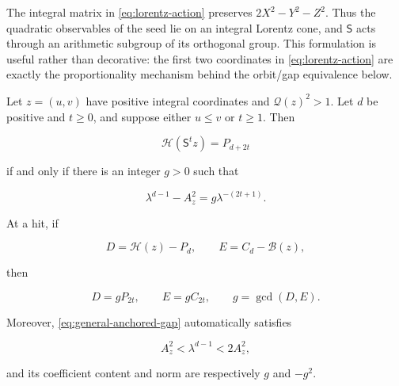 The integral matrix in \cref{eq:lorentz-action} preserves
$2X^2-Y^2-Z^2$. Thus the quadratic observables of the seed lie on an
integral Lorentz cone, and $\mathsf S$ acts through an arithmetic subgroup of
its orthogonal group. This formulation is useful rather than decorative:
the first two coordinates in \cref{eq:lorentz-action} are exactly the
proportionality mechanism behind the orbit/gap equivalence below.

\begin{theorem}
\label{thm:general-orbit-gap}
Let $z=(u,v)$ have positive integral coordinates and
$\mathcal Q(z)^2>1$. Let $d$ be positive and $t\geqslant0$, and suppose
either $u\leqslant v$ or $t\geqslant1$. Then

\begin{equation}
 \mathcal H(\mathsf S^tz)=P_{d+2t}
 \label{eq:general-orbit-hit}
\end{equation}

if and only if there is an integer $g>0$ such that

\begin{equation}
 \lambda^{d-1}-A_z^2=g\lambda^{-(2t+1)}.
 \label{eq:general-anchored-gap}
\end{equation}

At a hit, if

\begin{equation}
 D=\mathcal H(z)-P_d,
 \qquad
 E=C_d-\mathcal B(z),
 \label{eq:orbit-DE}
\end{equation}

then

\begin{equation}
 D=gP_{2t},
 \qquad
 E=gC_{2t},
 \qquad
 g=\gcd(D,E).
 \label{eq:orbit-proportionality}
\end{equation}

Moreover, \cref{eq:general-anchored-gap} automatically satisfies

\begin{equation}
 A_z^2<\lambda^{d-1}<2A_z^2,
 \label{eq:general-orbit-window}
\end{equation}

and its coefficient content and norm are respectively $g$ and $-g^2$.
\end{theorem}

